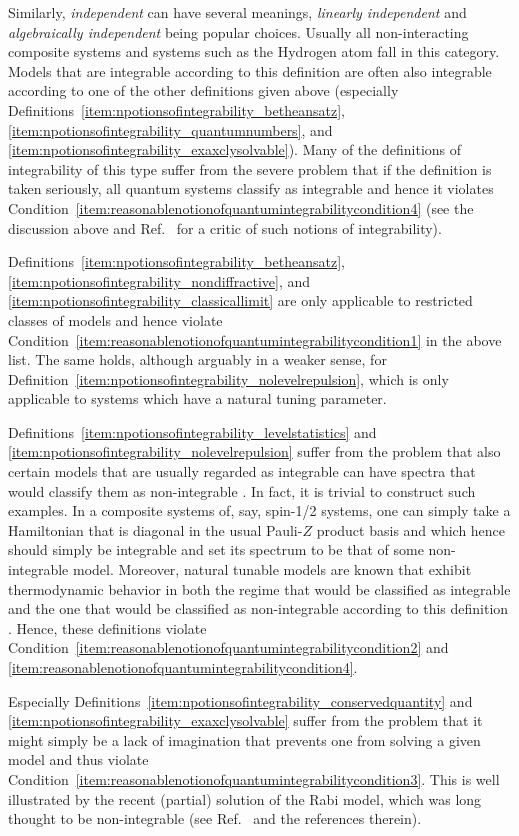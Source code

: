 \documentclass[a4paper,12pt,listof=totoc,index=totoc,bibliography=totoc,headsepline=false,headings=normal,BCOR16.153846mm,DIV12,headinclude,twoside,cleardoublepage=empty,numbers=noenddot,final]{scrreprt}
\theoremstyle{mystyle}
\numberwithin{equation}{section}
\numberwithin{figure}{section}
\numberwithin{lemma}{section}
\numberwithin{theorem}{section}
\numberwithin{corollary}{section}
\numberwithin{definition}{section}
\numberwithin{conjecture}{section}
\numberwithin{observation}{section}
\newcommand{\+}{\mkern2mu}
\DeclareMathOperator{\1}{\mathds{1}}
\begin{document}
Similarly, \emph{independent} can have several meanings, \emph{linearly independent} and \emph{algebraically independent} being popular choices.
Usually all non-interacting composite systems and systems such as the Hydrogen atom fall in this category.
Models that are integrable according to this definition are often also integrable according to one of the other definitions given above (especially Definitions~\ref{item:npotionsofintegrability_betheansatz}, \ref{item:npotionsofintegrability_quantumnumbers}, and \ref{item:npotionsofintegrability_exaxclysolvable}).
Many of the definitions of integrability of this type suffer from the severe problem that if the definition is taken seriously, all quantum systems classify as integrable and hence it violates Condition~\ref{item:reasonablenotionofquantumintegrabilitycondition4} (see the discussion above and Ref.~\cite{Weigert1992} for a critic of such notions of integrability).

Definitions~\ref{item:npotionsofintegrability_betheansatz}, \ref{item:npotionsofintegrability_nondiffractive}, and \ref{item:npotionsofintegrability_classicallimit} are only applicable to restricted classes of models and hence violate Condition~\ref{item:reasonablenotionofquantumintegrabilitycondition1} in the above list.
The same holds, although arguably in a weaker sense, for Definition~\ref{item:npotionsofintegrability_nolevelrepulsion}, which is only applicable to systems which have a natural tuning parameter.

Definitions~\ref{item:npotionsofintegrability_levelstatistics} and \ref{item:npotionsofintegrability_nolevelrepulsion} suffer from the problem that also certain models that are usually regarded as integrable can have spectra that would classify them as non-integrable \cite{Benet2003,Berry1977a}.
In fact, it is trivial to construct such examples.
In a composite systems of, say, spin-1/2 systems, one can simply take a Hamiltonian that is diagonal in the usual Pauli-$Z$ product basis and which hence should simply be integrable and set its spectrum to be that of some non-integrable model.
Moreover, natural tunable models are known that exhibit thermodynamic behavior in both the regime that would be classified as integrable and the one that would be classified as non-integrable according to this definition \cite{Jensen1985}.
Hence, these definitions violate Condition~\ref{item:reasonablenotionofquantumintegrabilitycondition2} and \ref{item:reasonablenotionofquantumintegrabilitycondition4}.

Especially Definitions~\ref{item:npotionsofintegrability_conservedquantity} and \ref{item:npotionsofintegrability_exaxclysolvable} suffer from the problem that it might simply be a lack of imagination that prevents one from solving a given model and thus violate Condition~\ref{item:reasonablenotionofquantumintegrabilitycondition3}.
This is well illustrated by the recent (partial) solution of the Rabi model, which was long thought to be non-integrable (see Ref.~\cite{Braak11} and the references therein).
\end{document}
